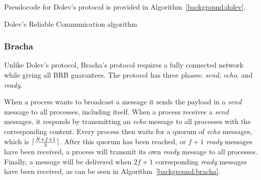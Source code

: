 Pseudocode for Dolev's protocol is provided in Algorithm~\ref{background:dolev}.

\begin{algorithm}
  \DontPrintSemicolon
  
  
 \caption{Dolev's Reliable Communication algorithm}
 \label{background:dolev}
\end{algorithm}

\subsubsection{Bracha}
Unlike Dolev's protocol, Bracha's protocol requires a fully connected network while giving all BRB guarantees. The protocol has three phases: \textit{send}, \textit{echo}, and \textit{ready}.

When a process wants to broadcast a message it sends the payload in a \textit{send} message to all processes, including itself. When a process receives a \textit{send} messages, it responds by transmitting an \textit{echo} message to all processes with the corresponding content. Every process then waits for a quorum of \textit{echo} messages, which is $\lceil\frac{N+f+1}{2}\rceil$. 
After this quorum has been reached, or $f+1$ \textit{ready} messages have been received, a process will transmit its own \textit{ready} message to all processes. Finally, a message will be delivered when $2f+1$ corresponding \textit{ready} messages have been received, as can be seen in Algorithm~\ref{background:bracha}.

